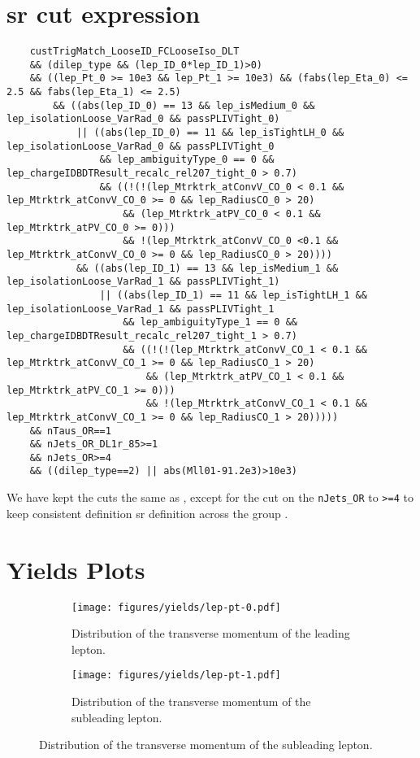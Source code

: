 \section{\gls{sr} cut expression}
\label{appendix:cut-expression}

{\scriptsize
    \begin{verbatim}
    custTrigMatch_LooseID_FCLooseIso_DLT
    && (dilep_type && (lep_ID_0*lep_ID_1)>0)
    && ((lep_Pt_0 >= 10e3 && lep_Pt_1 >= 10e3) && (fabs(lep_Eta_0) <= 2.5 && fabs(lep_Eta_1) <= 2.5)
        && ((abs(lep_ID_0) == 13 && lep_isMedium_0 && lep_isolationLoose_VarRad_0 && passPLIVTight_0)
            || ((abs(lep_ID_0) == 11 && lep_isTightLH_0 && lep_isolationLoose_VarRad_0 && passPLIVTight_0
                && lep_ambiguityType_0 == 0 && lep_chargeIDBDTResult_recalc_rel207_tight_0 > 0.7)
                && ((!(!(lep_Mtrktrk_atConvV_CO_0 < 0.1 && lep_Mtrktrk_atConvV_CO_0 >= 0 && lep_RadiusCO_0 > 20)
                    && (lep_Mtrktrk_atPV_CO_0 < 0.1 && lep_Mtrktrk_atPV_CO_0 >= 0)))
                    && !(lep_Mtrktrk_atConvV_CO_0 <0.1 && lep_Mtrktrk_atConvV_CO_0 >= 0 && lep_RadiusCO_0 > 20))))
            && ((abs(lep_ID_1) == 13 && lep_isMedium_1 && lep_isolationLoose_VarRad_1 && passPLIVTight_1)
                || ((abs(lep_ID_1) == 11 && lep_isTightLH_1 && lep_isolationLoose_VarRad_1 && passPLIVTight_1
                    && lep_ambiguityType_1 == 0 && lep_chargeIDBDTResult_recalc_rel207_tight_1 > 0.7)
                    && ((!(!(lep_Mtrktrk_atConvV_CO_1 < 0.1 && lep_Mtrktrk_atConvV_CO_1 >= 0 && lep_RadiusCO_1 > 20)
                        && (lep_Mtrktrk_atPV_CO_1 < 0.1 && lep_Mtrktrk_atPV_CO_1 >= 0)))
                        && !(lep_Mtrktrk_atConvV_CO_1 < 0.1 && lep_Mtrktrk_atConvV_CO_1 >= 0 && lep_RadiusCO_1 > 20)))))
    && nTaus_OR==1
    && nJets_OR_DL1r_85>=1
    && nJets_OR>=4
    && ((dilep_type==2) || abs(Mll01-91.2e3)>10e3)
\end{verbatim}
}

We have kept the cuts the same as \cite{severin}, except for the cut on the \verb|nJets_OR| to \verb|>=4| to keep
consistent definition \gls{sr} definition across the group .

\section{Yields Plots}
\label{appendix:yields}

\begin{figure}[htb!]
    \centering
    \begin{subfigure}{0.45\textwidth}
        \texttt{[image: figures/yields/lep-pt-0.pdf]}
        \caption{Distribution of the transverse momentum of the leading lepton.}
    \end{subfigure}\hfill%
    \begin{subfigure}{0.45\textwidth}
        \texttt{[image: figures/yields/lep-pt-1.pdf]}
        \caption{Distribution of the transverse momentum of the subleading lepton.}
    \end{subfigure}
\end{figure}

